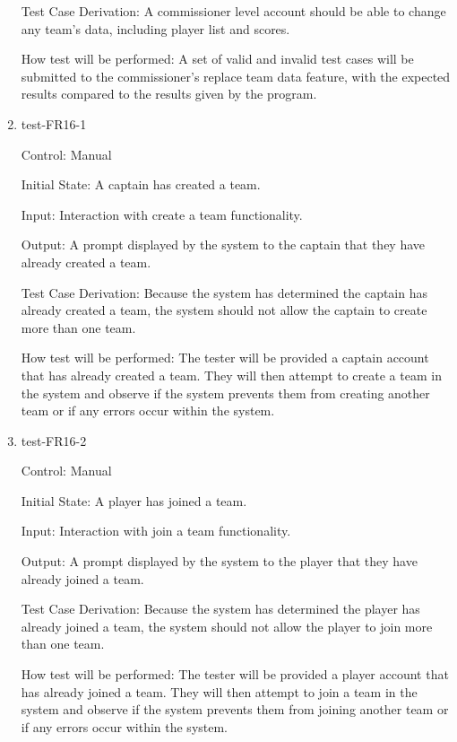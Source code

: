 \documentclass[12pt, titlepage]{article}
\begin{document}
\begin{enumerate}
  Test Case Derivation: A commissioner level account should be able to change
  any team's data, including player list and scores.

  How test will be performed: A set of valid and invalid test cases will be
  submitted to the commissioner's replace team data feature, with the expected
  results compared to the results given by the program.

  \item{test-FR16-1\\}

  Control: Manual
            
  Initial State: A captain has created a team.
            
  Input: Interaction with create a team functionality.
            
  Output: A prompt displayed by the system to the captain that they have already created
  a team.

  Test Case Derivation: Because the system has determined the captain has already created a
  team, the system should not allow the captain to create more than one team.
            
  How test will be performed: The tester will be provided a captain account that has already
  created a team. They will then attempt to create a team in the system and observe if the
  system prevents them from creating another team or if any errors occur within the system.

  \item{test-FR16-2\\}

  Control: Manual
            
  Initial State: A player has joined a team.
            
  Input: Interaction with join a team functionality.
            
  Output: A prompt displayed by the system to the player that they have already joined
  a team.

  Test Case Derivation: Because the system has determined the player has already joined a
  team, the system should not allow the player to join more than one team.
            
  How test will be performed: The tester will be provided a player account that has already
  joined a team. They will then attempt to join a team in the system and observe if the
  system prevents them from joining another team or if any errors occur within the system.

\end{enumerate}
\end{document}
